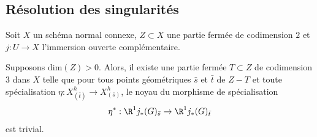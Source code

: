 \documentclass[10pt]{../fichiers-configuration-latex/smfart}
\begin{document}
\subsection{Résolution des singularités}

\begin{lemme} \label{21-trivial-kernel}
Soit $X$ un schéma normal connexe,
$Z \subset X$ une partie fermée de codimension $2$
 et $j:U \rightarrow X$ l'immersion ouverte complémentaire.

Supposons $\mathrm{dim}(Z)>0$.
Alors, il existe une partie fermée $T \subset Z$ 
de codimension $3$ dans $X$ telle que pour tous points géométriques 
$\bar s$ et $\bar t$ de $Z-T$
 et toute spécialisation
  $\eta:X_{(\bar t)}^h \rightarrow X_{(\bar s)}^h$,
le noyau du morphisme de spécialisation
$$
\eta^*:\R^1 j_*(G)_{\bar s} \rightarrow \R^1 j_*(G)_{\bar t}
$$
est trivial.
\end{lemme}
\end{document}

